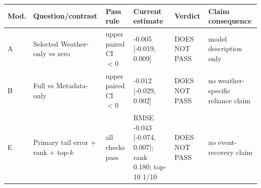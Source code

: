 \begin{tabular}{p{}p{}p{}p{}p{}p{}}
\toprule
Mod. & Question/contrast & Pass rule & Current estimate & Verdict & Claim consequence \\
\midrule
A & Selected Weather-only vs zero & upper paired CI $<0$ & -0.005 [-0.019, 0.009] & DOES NOT PASS & model description only \\
B & Full vs Metadata-only & upper paired CI $<0$ & -0.012 [-0.029, 0.002] & DOES NOT PASS & no weather-specific reliance claim \\
E & Primary tail error + rank + top-$k$ & all checks pass & RMSE -0.043 [-0.074, 0.007]; rank 0.180; top-10 1/10 & DOES NOT PASS & no event-recovery claim \\
\bottomrule
\end{tabular}

